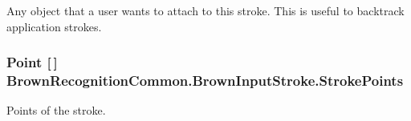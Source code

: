 \-Any object that a user wants to attach to this stroke. \-This is useful to backtrack application strokes. 

\hypertarget{class_brown_recognition_common_1_1_brown_input_stroke_a538b5a9e1d537247888ba5475974fb9e}{
\subsubsection[{\-Stroke\-Points}]{\setlength{\rightskip}{0pt plus 5cm}\-Point \mbox{[}$\,$\mbox{]} {\bf \-Brown\-Recognition\-Common.\-Brown\-Input\-Stroke.\-Stroke\-Points}}}
\label{class_brown_recognition_common_1_1_brown_input_stroke_a538b5a9e1d537247888ba5475974fb9e}


\-Points of the stroke. 

